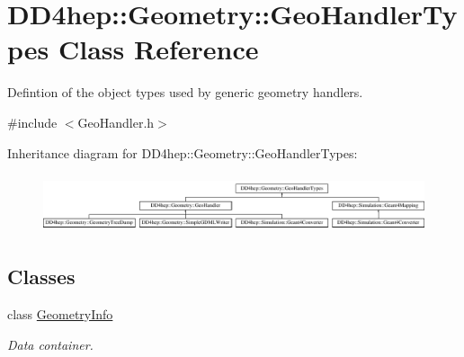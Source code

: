 \hypertarget{class_d_d4hep_1_1_geometry_1_1_geo_handler_types}{}\section{D\+D4hep\+:\+:Geometry\+:\+:Geo\+Handler\+Types Class Reference}
\label{class_d_d4hep_1_1_geometry_1_1_geo_handler_types}


Defintion of the object types used by generic geometry handlers.  




{\ttfamily \#include $<$Geo\+Handler.\+h$>$}

Inheritance diagram for D\+D4hep\+:\+:Geometry\+:\+:Geo\+Handler\+Types\+:\begin{figure}[H]
\begin{center}
\leavevmode
\includegraphics[height=1.721312cm]{class_d_d4hep_1_1_geometry_1_1_geo_handler_types}
\end{center}
\end{figure}
\subsection*{Classes}
\begin{DoxyCompactItemize}
\item 
class \hyperlink{class_d_d4hep_1_1_geometry_1_1_geo_handler_types_1_1_geometry_info}{Geometry\+Info}
\begin{DoxyCompactList}\small\item\em Data container. \end{DoxyCompactList}\end{DoxyCompactItemize}
